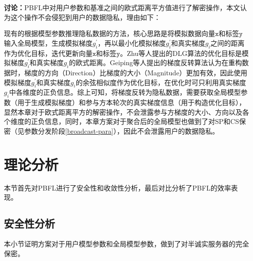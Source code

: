 
\textbf{讨论：}PBFL中对用户参数和基准之间的欧式距离平方值进行了解密操作，本文认为这个操作不会侵犯到用户的数据隐私，理由如下：

现有的根据模型参数推理隐私数据的方法\cite{zhu2019deep, geiping2020inverting}，核心思路是将模拟数据向量$\mathtt{x}$和标签$\mathtt{y}$输入全局模型，生成模拟梯度$g_i^{\prime}$，再以最小化模拟梯度$g_i^{\prime}$和真实梯度$g_i$之间的距离作为优化目标，迭代更新向量$\mathtt{x}$和标签$\mathtt{y}$。Zhu等人\cite{zhu2019deep}提出的DLG算法的优化目标是模拟梯度$g_i^{\prime}$和真实梯度$g_i$的欧式距离。Geiping等人\cite{geiping2020inverting}提出的梯度反转算法认为在重构数据时，梯度的方向（Direction）比梯度的大小（Magnitude）更加有效，因此使用模拟梯度$g_i^{\prime}$和真实梯度$g_i$的余弦相似度作为优化目标，在优化时可只利用真实梯度$g_i$中各维度的正负信息。综上可知，将梯度反转为隐私数据，需要获取全局模型参数（用于生成模拟梯度）和参与方本轮次的真实梯度信息（用于构造优化目标），显然本章对于欧式距离平方的解密操作，不会泄露参与方梯度的大小、方向以及各个维度的正负信息，同时，本章方案对于聚合后的全局模型也做到了对SP和CS保密（见参数分发阶段\ref{broadcast-para}），因此不会泄露用户的数据隐私。

\section{理论分析}\label{ana}
本节首先对PBFL进行了安全性和收敛性分析，最后对比分析了PBFL的效率表现。
\subsection{安全性分析}\label{sec-ana}
本小节证明方案对于用户模型参数和全局模型参数，做到了对半诚实服务器的完全保密。

